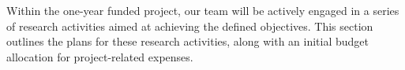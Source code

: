 
Within the one-year funded project, our team will be actively engaged in a series of research activities aimed at achieving the defined objectives. This section outlines the plans for these research activities, along with an initial budget allocation for project-related expenses.







